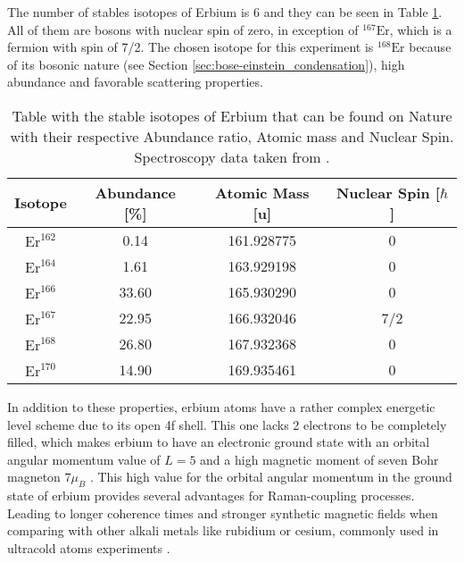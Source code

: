 The number of stables isotopes of Erbium is 6 and they can be seen in Table \ref{tab:Isotopes_Erbium}. All of them are bosons with nuclear spin of zero, in exception of $^{\text{167}}\text{Er}$, which is a fermion with spin of 7/2. The chosen isotope for this experiment is $^{\text{168}}\text{Er}$ because of its bosonic nature (see Section \ref{sec:bose-einstein_condensation}), high abundance and favorable scattering properties.

\begin{table}[htbp] \centering
	\begin{tabular}{@{}c|c|c|c@{}}\hline
		Isotope                  & Abundance [\%]          & Atomic Mass [u] & Nuclear Spin [$\hbar$] \\ \hline\hline
		$\text{Er}^{\text{162}}$ &  0.14                   & 161.928775      & 0   \\
		$\text{Er}^{\text{164}}$ &  1.61                   & 163.929198      & 0   \\ 
		$\text{Er}^{\text{166}}$ & 33.60                   & 165.930290      & 0   \\
		$\text{Er}^{\text{167}}$ & 22.95                   & 166.932046      & 7/2   \\
		$\text{Er}^{\text{168}}$ & 26.80                   & 167.932368      & 0   \\  
		$\text{Er}^{\text{170}}$ & 14.90                   & 169.935461      & 0   \\  \hline
	\end{tabular}
	\caption[Table with the stable isotopes of Erbium]{Table with the stable isotopes of Erbium that can be found on Nature with their respective Abundance ratio, Atomic mass and Nuclear Spin. Spectroscopy data taken from \cite{sansonetti2005handbook}.}\label{tab:Isotopes_Erbium}
\end{table}

In addition to these properties, erbium atoms have a rather complex energetic level scheme due to its open 4f shell. This one lacks 2 electrons to be completely filled, which makes erbium to have an electronic ground state with an orbital angular momentum value of $L = 5$ and a high magnetic moment of seven Bohr magneton $7\mu_B$ \cite{ban2005laser}. This high value for the orbital angular momentum in the ground state of erbium provides several advantages for Raman-coupling processes. Leading to longer coherence times and stronger synthetic magnetic fields when comparing with other alkali metals like rubidium or cesium, commonly used in ultracold atoms experiments  \cite{cui2013synthetic}.


